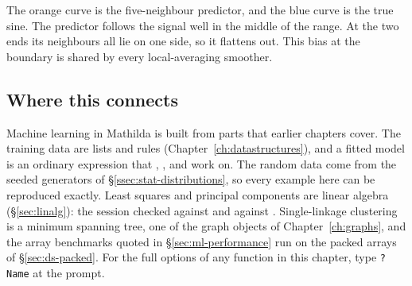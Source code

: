 The orange curve is the five-neighbour predictor, and the blue curve is the true
sine. The predictor follows the signal well in the middle of the range. At the two
ends its neighbours all lie on one side, so it flattens out. This bias at the
boundary is shared by every local-averaging smoother.

\subsection*{Where this connects}

Machine learning in Mathilda is built from parts that earlier chapters cover. The
training data are lists and rules (Chapter~\ref{ch:datastructures}), and a fitted
model is an ordinary expression that , , and  work
on. The random data come from the seeded generators of
\S\ref{ssec:stat-distributions}, so every example here can be reproduced exactly.
Least squares and principal components are linear algebra (\S\ref{sec:linalg}):
the session checked  against  and
 against . Single-linkage
clustering is a minimum spanning tree, one of the graph objects of
Chapter~\ref{ch:graphs}, and the array benchmarks quoted in
\S\ref{sec:ml-performance} run on the packed arrays of \S\ref{sec:ds-packed}. For
the full options of any function in this chapter, type \texttt{?Name} at the
prompt.
